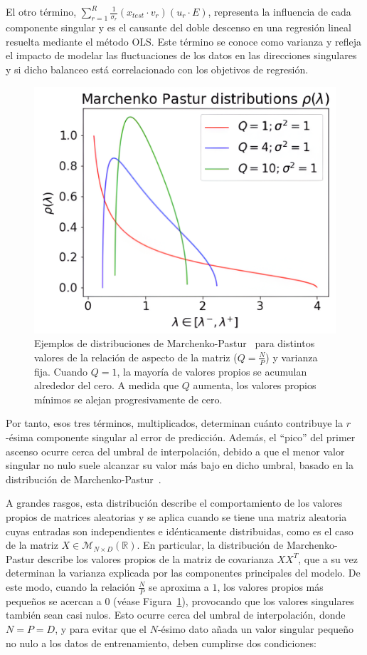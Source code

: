El otro término, $\sum_{r=1}^{R}\frac{1}{\sigma_r}(x_{test} \cdot v_r)(u_r \cdot E)$, representa la influencia de cada componente singular y es el causante del doble descenso en una regresión lineal resuelta mediante el método OLS. Este término se conoce como varianza y refleja el impacto de modelar las fluctuaciones de los datos en las direcciones singulares y si dicho balanceo está correlacionado con los objetivos de regresión.\newline

\begin{figure}[h]
    \centering
    \includegraphics[width=0.6\linewidth]{img/marchenku-pastor.png}
    \caption[Ejemplos de distribuciones de Marchenko-Pastur~\cite{Charles2018}.]{Ejemplos de distribuciones de Marchenko-Pastur~\cite{Charles2018} para distintos valores de la relación de aspecto de la matriz ($Q = \frac{N}{P}$) y varianza fija. Cuando $Q = 1$, la mayoría de valores propios se acumulan alrededor del cero. A medida que $Q$ aumenta, los valores propios mínimos se alejan progresivamente de cero.}\label{fig:marchenkopastur}
\end{figure}

Por tanto, esos tres términos, multiplicados, determinan cuánto contribuye la $r$-ésima componente singular al error de predicción. Además, el ``pico'' del primer ascenso ocurre cerca del umbral de interpolación, debido a que el menor valor singular no nulo suele alcanzar su valor más bajo en dicho umbral, basado en la distribución de Marchenko-Pastur~\cite{Marchenko1967}.\newline

A grandes rasgos, esta distribución describe el comportamiento de los valores propios de matrices aleatorias y se aplica cuando se tiene una matriz aleatoria cuyas entradas son independientes e idénticamente distribuidas, como es el caso de la matriz $X \in \mathcal{M}_{N \times D}(\mathbb{R})$. En particular, la distribución de Marchenko-Pastur describe los valores propios de la matriz de covarianza $XX^{T}$, que a su vez determinan la varianza explicada por las componentes principales del modelo. De este modo, cuando la relación $\frac{N}{P}$ se aproxima a $1$, los valores propios más pequeños se acercan a $0$ (véase Figura~\ref{fig:marchenkopastur}), provocando que los valores singulares también sean casi nulos. Esto ocurre cerca del umbral de interpolación, donde $N = P = D$, y para evitar que el $N$-ésimo dato añada un valor singular pequeño no nulo a los datos de entrenamiento, deben cumplirse dos condiciones: 

